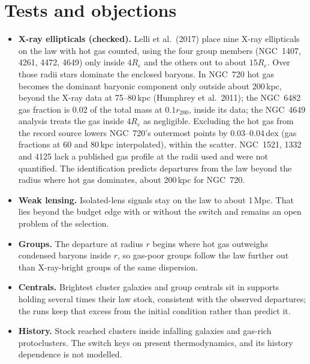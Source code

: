 \documentclass[11pt]{article}
\begin{document}
\section{Tests and objections}
\begin{itemize}
\item \textbf{X-ray ellipticals (checked).} Lelli et al.\ (2017) place nine X-ray
ellipticals on the law with hot gas counted, using the four group members (NGC~1407,
4261, 4472, 4649) only inside $4R_e$ and the others out to about $15R_e$. Over those radii
stars dominate the enclosed baryons. In NGC~720 hot gas becomes the dominant baryonic
component only outside about 200\,kpc, beyond the X-ray data at 75--80\,kpc (Humphrey et
al.\ 2011); the NGC~6482 gas fraction is 0.02 of the total mass at $0.1r_{200}$, inside its
data; the NGC~4649 analysis treats the gas inside $4R_e$ as negligible. Excluding the
hot gas from the record source lowers NGC~720's outermost points by 0.03--0.04\,dex
(gas fractions at 60 and 80\,kpc interpolated), within the scatter. NGC~1521, 1332 and
4125 lack a published gas profile at the radii used and were not quantified. The
identification predicts departures from the law beyond the radius where hot gas
dominates, about 200\,kpc for NGC~720.
\item \textbf{Weak lensing.} Isolated-lens signals stay on the law to about 1\,Mpc. That
lies beyond the budget edge with or without the switch and remains an open problem of the
selection.
\item \textbf{Groups.} The departure at radius $r$ begins where hot gas outweighs condensed
baryons inside $r$, so gas-poor groups follow the law further out than X-ray-bright groups
of the same dispersion.
\item \textbf{Centrals.} Brightest cluster galaxies and group centrals sit in supports
holding several times their law stock, consistent with the observed departures; the
runs keep that excess from the initial condition rather than predict it.
\item \textbf{History.} Stock reached clusters inside infalling galaxies and gas-rich
protoclusters. The switch keys on present thermodynamics, and its history dependence is
not modelled.
\end{itemize}
\end{document}
